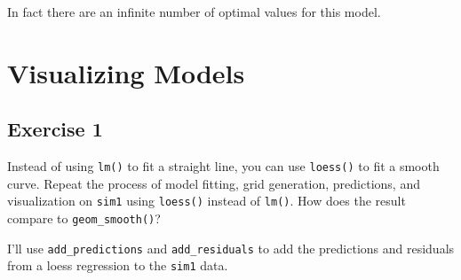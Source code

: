 \documentclass[]{book}
\newenvironment{Shaded}{\begin{snugshade}}{\end{snugshade}}
\newcommand{\CommentTok}[1]{\textcolor[rgb]{0.56,0.35,0.01}{\textit{#1}}}
\newcommand{\DataTypeTok}[1]{\textcolor[rgb]{0.13,0.29,0.53}{#1}}
\newcommand{\DecValTok}[1]{\textcolor[rgb]{0.00,0.00,0.81}{#1}}
\newcommand{\KeywordTok}[1]{\textcolor[rgb]{0.13,0.29,0.53}{\textbf{#1}}}
\newcommand{\NormalTok}[1]{#1}
\newcommand{\OperatorTok}[1]{\textcolor[rgb]{0.81,0.36,0.00}{\textbf{#1}}}
\newcommand{\StringTok}[1]{\textcolor[rgb]{0.31,0.60,0.02}{#1}}
\theoremstyle{plain}
\theoremstyle{remark}
\theoremstyle{definition}
\theoremstyle{definition}
\theoremstyle{definition}
\theoremstyle{remark}
\begin{document}
\begin{Shaded}
\end{Shaded}

\begin{Shaded}
\end{Shaded}

In fact there are an infinite number of optimal values for this model.

\hypertarget{visualizing-models}{%
\section{Visualizing Models}\label{visualizing-models}}

\hypertarget{exercise-1-63}{%
\subsection{Exercise 1}\label{exercise-1-63}}

Instead of using \texttt{lm()} to fit a straight line, you can use
\texttt{loess()} to fit a smooth curve. Repeat the process of model
fitting, grid generation, predictions, and visualization on
\texttt{sim1} using \texttt{loess()} instead of \texttt{lm()}. How does
the result compare to \texttt{geom\_smooth()}?

I'll use \texttt{add\_predictions} and \texttt{add\_residuals} to add
the predictions and residuals from a loess regression to the
\texttt{sim1} data.
\end{document}
